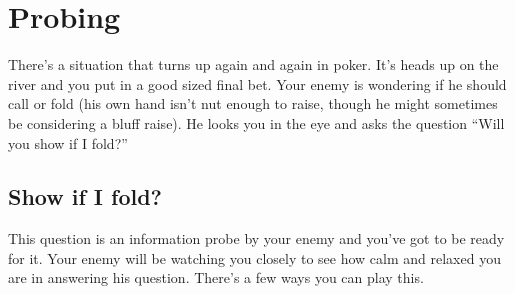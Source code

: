 \chapter{Probing}


There's a situation that turns up again and again in poker.
It's heads up on the river and you put in a good sized final bet.
Your enemy is wondering if he should call or fold (his own hand
isn't nut enough to raise, though he might sometimes be considering a
bluff raise). He looks you in the eye and asks the question ``Will you
show if I fold?''

\section{Show if I fold?}

This question is an information probe by your enemy and you've got
to be ready for it. Your enemy will be watching you closely
to see how calm and relaxed you are in answering his question.
There's a few ways you can play this.

